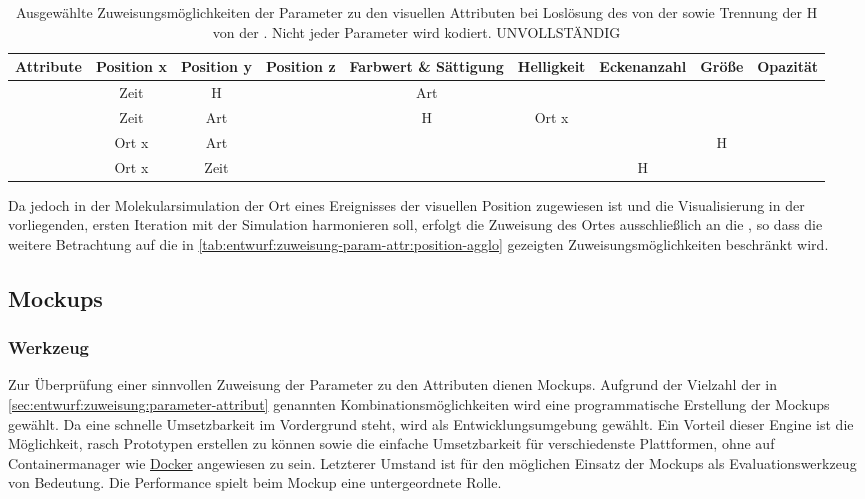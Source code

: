 \begin{table}
	\begin{tabularx}{\textwidth}{@{}CCCCCCCCC@{}}
		\toprule
		Attribute & Position x & Position y & Position z & Farbwert \& Sättigung & Helligkeit & Eckenanzahl & Größe & Opazität \tabularnewline
		\midrule
		& Zeit & H & & Art \tabularnewline
		& Zeit & Art & & H & Ort x \tabularnewline
		& Ort x & Art & & & & & H \tabularnewline
		& Ort x & Zeit & & & & H & \tabularnewline
		\bottomrule
	\end{tabularx}
	\caption{Ausgewählte Zuweisungsmöglichkeiten der Parameter zu den visuellen Attributen bei Loslösung des  von der  sowie Trennung der  H von der . Nicht jeder Parameter wird kodiert. UNVOLLSTÄNDIG}\label{tab:entwurf:zuweisung-param-attr:frei}
\end{table}

Da jedoch in der Molekularsimulation der Ort eines Ereignisses der visuellen Position zugewiesen ist und die Visualisierung in der vorliegenden, ersten Iteration mit der Simulation harmonieren soll, erfolgt die Zuweisung des Ortes ausschließlich an die , so dass die weitere Betrachtung auf die in \autoref{tab:entwurf:zuweisung-param-attr:position-agglo} gezeigten Zuweisungsmöglichkeiten beschränkt wird.

\subsection{Mockups}\label{sec:mockups}

\subsubsection{Werkzeug}\label{sec:mockups:werkzeug}
Zur Überprüfung einer sinnvollen Zuweisung der Parameter zu den Attributen dienen Mockups. Aufgrund der Vielzahl der in \autoref{sec:entwurf:zuweisung:parameter-attribut} genannten Kombinationsmöglichkeiten wird eine programmatische Erstellung der Mockups gewählt. Da eine schnelle Umsetzbarkeit im Vordergrund steht, wird  als Entwicklungsumgebung gewählt. Ein Vorteil dieser Engine ist die Möglichkeit, rasch Prototypen erstellen zu können sowie die einfache Umsetzbarkeit für verschiedenste Plattformen, ohne auf Containermanager wie \href{https://www.docker.com/}{Docker} angewiesen zu sein. Letzterer Umstand ist für den möglichen Einsatz der Mockups als Evaluationswerkzeug von Bedeutung. Die Performance spielt beim Mockup eine untergeordnete Rolle.


